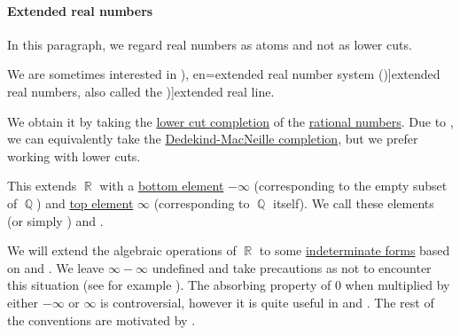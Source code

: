 \paragraph{Extended real numbers}\hfill

In this paragraph, we regard real numbers as atoms and not as lower cuts.

\begin{definition}\label{def:extended_real_numbers}\mimprovised
  We are sometimes interested in \term[ru=расширенная вещественная прямая (\cite[23]{ИоффеТихомиров1974ЭкстремальныеЗадачи}), en=extended real number system (\cite[10]{Folland1999RealAnalysis})]{extended real numbers}, also called the \term[en=extended real line (\cite[\S 1.4]{Rudin1987RealAndComplexAnalysis})]{extended real line}.

  We obtain it by taking the \hyperref[def:lower_cut_completion]{ lower cut completion} of the \hyperref[def:rational_numbers]{rational numbers}. Due to , we can equivalently take the \hyperref[def:dedekind_macnielle_completion]{Dedekind-MacNeille completion}, but we prefer working with lower cuts.

  This extends \( \BbbR \) with a \hyperref[def:extremal_points/top_and_bottom]{bottom element} \( -\infty \) (corresponding to the empty subset of \( \BbbQ \)) and \hyperref[def:extremal_points/top_and_bottom]{top element} \( \infty \) (corresponding to \( \BbbQ \) itself). We call these elements  (or simply ) and .

  We will extend the algebraic operations of \( \BbbR \) to some \hyperref[def:indeterminate_form]{indeterminate forms} based on \cite[\S 1.1.17]{Schechter1997AnalysisHandbook} and \cite[11]{Folland1999RealAnalysis}. We leave \( \infty - \infty \) undefined and take precautions as not to encounter this situation (see for example ). The absorbing property of \( 0 \) when multiplied by either \( -\infty \) or \( \infty \) is controversial, however it is quite useful in  and . The rest of the conventions are motivated by .


\end{definition}
